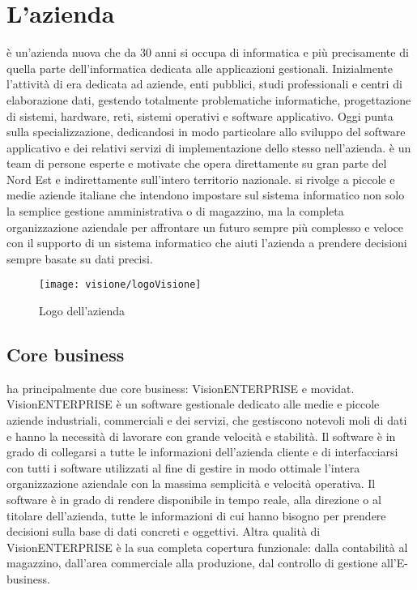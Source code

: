 \section{L'azienda}

\visione{} è un'azienda nuova che da 30 anni si occupa di informatica e più precisamente di quella parte dell'informatica dedicata alle applicazioni gestionali. Inizialmente l'attività di \visione{} era dedicata ad aziende, enti pubblici, studi professionali e centri di elaborazione dati, gestendo totalmente problematiche informatiche, progettazione di sistemi, hardware, reti, sistemi operativi e software applicativo. Oggi \visione{} punta sulla specializzazione, dedicandosi in modo particolare allo sviluppo del software applicativo e dei relativi servizi di implementazione dello stesso nell'azienda. \visione{} è un team di persone esperte e motivate che opera direttamente su gran parte del Nord Est e indirettamente sull'intero territorio nazionale. \visione{} si rivolge a piccole e medie aziende italiane che intendono impostare sul sistema informatico non solo la semplice gestione amministrativa o di magazzino, ma la completa organizzazione aziendale per affrontare un futuro sempre più complesso e veloce con il supporto di un sistema informatico che aiuti l'azienda a prendere decisioni sempre basate su dati precisi.

\begin{figure}[!h] 
    \centering 
    \texttt{[image: visione/logoVisione]} 
    \caption{Logo dell'azienda \visione{}}
\end{figure}

\subsection{Core business}

\visione{} ha principalmente due core business: VisionENTERPRISE e movidat. VisionENTERPRISE è un software gestionale  dedicato alle medie e piccole aziende industriali, commerciali e dei servizi, che gestiscono notevoli moli di dati e hanno la necessità di lavorare con grande velocità e stabilità. Il software è in grado di collegarsi a tutte le informazioni dell'azienda cliente e di interfacciarsi con tutti i software utilizzati al fine di gestire in modo ottimale l'intera organizzazione aziendale con la massima semplicità e velocità operativa. Il software è in grado di rendere disponibile in tempo reale, alla direzione o al titolare dell'azienda, tutte le informazioni di cui hanno bisogno per prendere decisioni sulla base di dati concreti e oggettivi. Altra qualità di VisionENTERPRISE è la sua completa copertura funzionale: dalla contabilità al magazzino, dall'area commerciale alla produzione, dal controllo di gestione all'E-business.

